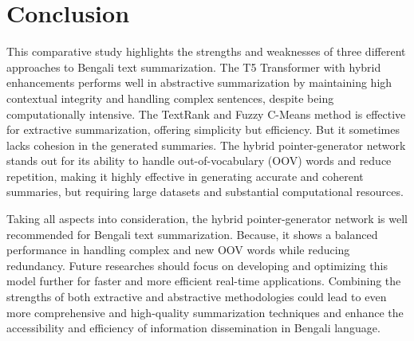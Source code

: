 \documentclass[12pt]{report}
\begin{document}
\section*{Conclusion}
This comparative study highlights the strengths and weaknesses of three different approaches to Bengali text summarization. The T5 Transformer with hybrid enhancements performs well in abstractive summarization by maintaining high contextual integrity and handling complex sentences, despite being computationally intensive. The TextRank and Fuzzy C-Means method is effective for extractive summarization, offering simplicity but efficiency. But it sometimes lacks cohesion in the generated summaries. The hybrid pointer-generator network stands out for its ability to handle out-of-vocabulary (OOV) words and reduce repetition, making it highly effective in generating accurate and coherent summaries, but requiring large datasets and substantial computational resources.

Taking all aspects into consideration, the hybrid pointer-generator network is well recommended for Bengali text summarization. Because, it shows a balanced performance in handling complex and new OOV words while reducing redundancy. Future researches should focus on developing and optimizing this model further for faster and more efficient real-time applications. Combining the strengths of both extractive and abstractive methodologies could lead to even more comprehensive and high-quality summarization techniques and enhance the accessibility and efficiency of information dissemination in Bengali language.

\end{document}
